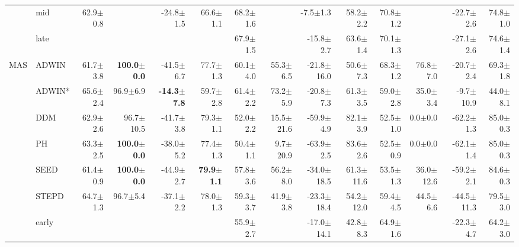 \begin{tabular}{llrrrrrrrrrrrr}
 & mid & 62.9\tiny{$\pm$0.8} &  & -24.8\tiny{$\pm$1.5} & 66.6\tiny{$\pm$1.1} & 68.2\tiny{$\pm$1.6} &  & -7.5\tiny{$\pm$1.3} & 58.2\tiny{$\pm$2.2} & 70.8\tiny{$\pm$1.2} &  & -22.7\tiny{$\pm$2.6} & 74.8\tiny{$\pm$1.0} \\
 & late &  &  &  &  & 67.9\tiny{$\pm$1.5} &  & -15.8\tiny{$\pm$2.7} & 63.6\tiny{$\pm$1.4} & 70.1\tiny{$\pm$1.3} &  & -27.1\tiny{$\pm$2.6} & 74.6\tiny{$\pm$1.4} \\
\midrule
\multirow[t]{9}{*}{MAS} & ADWIN & 61.7\tiny{$\pm$3.8} & \textbf{100.0\tiny{$\pm$0.0}} & -41.5\tiny{$\pm$6.7} & 77.7\tiny{$\pm$1.3} & 60.1\tiny{$\pm$4.0} & 55.3\tiny{$\pm$6.5} & -21.8\tiny{$\pm$16.0} & 50.6\tiny{$\pm$7.3} & 68.3\tiny{$\pm$1.2} & 76.8\tiny{$\pm$7.0} & -20.7\tiny{$\pm$2.4} & 69.3\tiny{$\pm$1.8} \\
 & ADWIN* & 65.6\tiny{$\pm$2.4} & 96.9\tiny{$\pm$6.9} & \textbf{-14.3\tiny{$\pm$7.8}} & 59.7\tiny{$\pm$2.8} & 61.4\tiny{$\pm$2.2} & 73.2\tiny{$\pm$5.9} & -20.8\tiny{$\pm$7.3} & 61.3\tiny{$\pm$3.5} & 59.0\tiny{$\pm$2.8} & 35.0\tiny{$\pm$3.4} & -9.7\tiny{$\pm$10.9} & 44.0\tiny{$\pm$8.1} \\
 & DDM & 62.9\tiny{$\pm$2.6} & 96.7\tiny{$\pm$10.5} & -41.7\tiny{$\pm$3.8} & 79.3\tiny{$\pm$1.1} & 52.0\tiny{$\pm$2.2} & 15.5\tiny{$\pm$21.6} & -59.9\tiny{$\pm$4.9} & 82.1\tiny{$\pm$3.9} & 52.5\tiny{$\pm$1.0} & 0.0\tiny{$\pm$0.0} & -62.2\tiny{$\pm$1.3} & 85.0\tiny{$\pm$0.3} \\
 & PH & 63.3\tiny{$\pm$2.5} & \textbf{100.0\tiny{$\pm$0.0}} & -38.0\tiny{$\pm$5.2} & 77.4\tiny{$\pm$1.3} & 50.4\tiny{$\pm$1.1} & 9.7\tiny{$\pm$20.9} & -63.9\tiny{$\pm$2.5} & 83.6\tiny{$\pm$2.6} & 52.5\tiny{$\pm$0.9} & 0.0\tiny{$\pm$0.0} & -62.1\tiny{$\pm$1.4} & 85.0\tiny{$\pm$0.3} \\
 & SEED & 61.4\tiny{$\pm$0.9} & \textbf{100.0\tiny{$\pm$0.0}} & -44.9\tiny{$\pm$2.7} & \textbf{79.9\tiny{$\pm$1.1}} & 57.8\tiny{$\pm$3.6} & 56.2\tiny{$\pm$8.0} & -34.0\tiny{$\pm$18.5} & 61.3\tiny{$\pm$11.6} & 53.5\tiny{$\pm$1.3} & 36.0\tiny{$\pm$12.6} & -59.2\tiny{$\pm$2.1} & 84.6\tiny{$\pm$0.3} \\
 & STEPD & 64.7\tiny{$\pm$1.3} & 96.7\tiny{$\pm$5.4} & -37.1\tiny{$\pm$2.2} & 78.0\tiny{$\pm$1.3} & 59.3\tiny{$\pm$3.7} & 41.9\tiny{$\pm$3.8} & -23.3\tiny{$\pm$18.4} & 54.2\tiny{$\pm$12.0} & 59.4\tiny{$\pm$4.5} & 44.5\tiny{$\pm$6.6} & -44.5\tiny{$\pm$11.3} & 79.5\tiny{$\pm$3.0} \\
 & early &  &  &  &  & 55.9\tiny{$\pm$2.7} &  & -17.0\tiny{$\pm$14.1} & 42.8\tiny{$\pm$8.3} & 64.9\tiny{$\pm$1.6} &  & -22.3\tiny{$\pm$4.7} & 64.2\tiny{$\pm$3.0} \\

\end{tabular}
